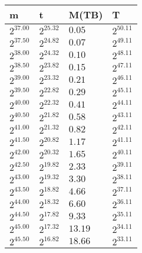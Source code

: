 \begin{tabular}{llll}
m & t & M(TB) & T \\ \hline
$2^{37.00}$ & $2^{25.32}$ & $0.05$ & $2^{50.11}$ \\
$2^{37.50}$ & $2^{24.82}$ & $0.07$ & $2^{49.11}$ \\
$2^{38.00}$ & $2^{24.32}$ & $0.10$ & $2^{48.11}$ \\
$2^{38.50}$ & $2^{23.82}$ & $0.15$ & $2^{47.11}$ \\
$2^{39.00}$ & $2^{23.32}$ & $0.21$ & $2^{46.11}$ \\
$2^{39.50}$ & $2^{22.82}$ & $0.29$ & $2^{45.11}$ \\
$2^{40.00}$ & $2^{22.32}$ & $0.41$ & $2^{44.11}$ \\
$2^{40.50}$ & $2^{21.82}$ & $0.58$ & $2^{43.11}$ \\
$2^{41.00}$ & $2^{21.32}$ & $0.82$ & $2^{42.11}$ \\
$2^{41.50}$ & $2^{20.82}$ & $1.17$ & $2^{41.11}$ \\
$2^{42.00}$ & $2^{20.32}$ & $1.65$ & $2^{40.11}$ \\
$2^{42.50}$ & $2^{19.82}$ & $2.33$ & $2^{39.11}$ \\
$2^{43.00}$ & $2^{19.32}$ & $3.30$ & $2^{38.11}$ \\
$2^{43.50}$ & $2^{18.82}$ & $4.66$ & $2^{37.11}$ \\
$2^{44.00}$ & $2^{18.32}$ & $6.60$ & $2^{36.11}$ \\
$2^{44.50}$ & $2^{17.82}$ & $9.33$ & $2^{35.11}$ \\
$2^{45.00}$ & $2^{17.32}$ & $13.19$ & $2^{34.11}$ \\
$2^{45.50}$ & $2^{16.82}$ & $18.66$ & $2^{33.11}$ \\
\end{tabular}
\\\\
\\\\
